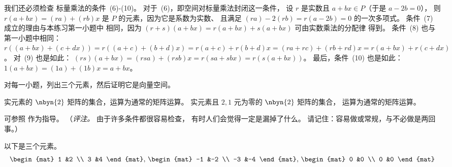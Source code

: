 \begin{exercises}
\begin{answer}
\begin{exparts}
          我们还必须检查
          标量乘法的条件~(6)-(10)。
          对于~(6)，即空间对标量乘法封闭这一条件，
          设 $r$ 是实数且 $a+bx\in P$（于是 $a-2b=0$），
          则 $r(a+bx)=(ra)+(rb)x$ 是
          $P$ 的元素，因为它是系数为实数、
          且满足 $(ra)-2(rb)=r(a-2b)=0$ 的一次多项式。
          条件~(7) 成立的理由与本练习第一小题中
          相同，因为
          $(r+s)(a+bx)=r(a+bx)+s(a+bx)$ 可由实数乘法的分配律
          得到。
          条件~(8) 也与第一小题中相同：
          $r((a+bx)+(c+dx))=r((a+c)+(b+d)x)=r(a+c)+r(b+d)x=(ra+rc)+(rb+rd)x
          =r(a+bx)+r(c+dx)$。
          对~(9) 也是如此：
          $(rs)(a+bx)=(rsa)+(rsb)x=r(sa+sbx)=r(s(a+bx))$。
          最后，条件~(10) 也是如此：
          $1(a+bx)=(1a)+(1b)x=a+bx$。
       \end{exparts}
     \end{answer}
  \item
    对每一小题，列出三个元素，然后证明它是向量空间。
    \begin{exparts}
      \partsitem 实元素的 \( \nbyn{2} \) 矩阵的集合，运算为通常的矩阵运算。
      \partsitem 实元素且 $2,1$ 元为零的 \( \nbyn{2} \) 矩阵的集合，
        运算为通常的矩阵运算。
    \end{exparts}
    \begin{answer}
      可参照
       作为指导。
      （\textit{评注。}
      由于许多条件都很容易检查，
      有时人们会觉得一定是漏掉了什么。
      请记住：容易做或常规，与不必做是两回事。）
      \begin{exparts}
        \partsitem
          以下是三个元素。
          \begin{equation*}
            \begin{mat}
              1  &2  \\
              3  &4
            \end{mat},\,
            \begin{mat}
              -1  &-2  \\
              -3  &-4
            \end{mat},\,
            \begin{mat}
              0  &0  \\
              0  &0
            \end{mat}
          \end{equation*}


\end{exparts}
\end{answer}
\end{exercises}
